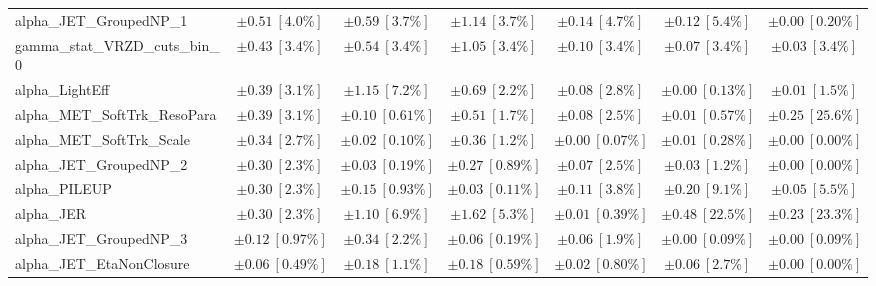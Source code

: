 \begin{sidewaystable}
\begin{center}
\begin{tabular*}{\textwidth}{@{\extracolsep{\fill}}lcccccc}
alpha\_JET\_GroupedNP\_1         & $\pm 0.51\ [4.0\%] $          & $\pm 0.59\ [3.7\%] $          & $\pm 1.14\ [3.7\%] $          & $\pm 0.14\ [4.7\%] $          & $\pm 0.12\ [5.4\%] $          & $\pm 0.00\ [0.20\%] $       \\
gamma\_stat\_VRZD\_cuts\_bin\_0         & $\pm 0.43\ [3.4\%] $          & $\pm 0.54\ [3.4\%] $          & $\pm 1.05\ [3.4\%] $          & $\pm 0.10\ [3.4\%] $          & $\pm 0.07\ [3.4\%] $          & $\pm 0.03\ [3.4\%] $       \\
alpha\_LightEff         & $\pm 0.39\ [3.1\%] $          & $\pm 1.15\ [7.2\%] $          & $\pm 0.69\ [2.2\%] $          & $\pm 0.08\ [2.8\%] $          & $\pm 0.00\ [0.13\%] $          & $\pm 0.01\ [1.5\%] $       \\
alpha\_MET\_SoftTrk\_ResoPara         & $\pm 0.39\ [3.1\%] $          & $\pm 0.10\ [0.61\%] $          & $\pm 0.51\ [1.7\%] $          & $\pm 0.08\ [2.5\%] $          & $\pm 0.01\ [0.57\%] $          & $\pm 0.25\ [25.6\%] $       \\
alpha\_MET\_SoftTrk\_Scale         & $\pm 0.34\ [2.7\%] $          & $\pm 0.02\ [0.10\%] $          & $\pm 0.36\ [1.2\%] $          & $\pm 0.00\ [0.07\%] $          & $\pm 0.01\ [0.28\%] $          & $\pm 0.00\ [0.00\%] $       \\
alpha\_JET\_GroupedNP\_2         & $\pm 0.30\ [2.3\%] $          & $\pm 0.03\ [0.19\%] $          & $\pm 0.27\ [0.89\%] $          & $\pm 0.07\ [2.5\%] $          & $\pm 0.03\ [1.2\%] $          & $\pm 0.00\ [0.00\%] $       \\
alpha\_PILEUP         & $\pm 0.30\ [2.3\%] $          & $\pm 0.15\ [0.93\%] $          & $\pm 0.03\ [0.11\%] $          & $\pm 0.11\ [3.8\%] $          & $\pm 0.20\ [9.1\%] $          & $\pm 0.05\ [5.5\%] $       \\
alpha\_JER         & $\pm 0.30\ [2.3\%] $          & $\pm 1.10\ [6.9\%] $          & $\pm 1.62\ [5.3\%] $          & $\pm 0.01\ [0.39\%] $          & $\pm 0.48\ [22.5\%] $          & $\pm 0.23\ [23.3\%] $       \\
alpha\_JET\_GroupedNP\_3         & $\pm 0.12\ [0.97\%] $          & $\pm 0.34\ [2.2\%] $          & $\pm 0.06\ [0.19\%] $          & $\pm 0.06\ [1.9\%] $          & $\pm 0.00\ [0.09\%] $          & $\pm 0.00\ [0.09\%] $       \\
alpha\_JET\_EtaNonClosure         & $\pm 0.06\ [0.49\%] $          & $\pm 0.18\ [1.1\%] $          & $\pm 0.18\ [0.59\%] $          & $\pm 0.02\ [0.80\%] $          & $\pm 0.06\ [2.7\%] $          & $\pm 0.00\ [0.00\%] $       \\

\end{tabular*}
\end{center}
\end{sidewaystable}
